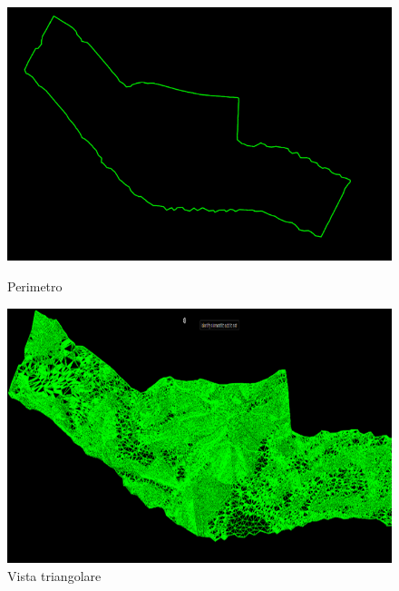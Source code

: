   \begin{figure}[H]
    \centering
    \begin{minipage}[b]{0.45\textwidth}
      \includegraphics[width=\textwidth]{Figures/perimetro.png}
      \caption{Perimetro}
      \label{perimetro}
    \end{minipage}
    \hfill
    \begin{minipage}[b]{0.45\textwidth}
      \includegraphics[width=\textwidth]{Figures/vista triangolare.png}
      \caption{Vista triangolare}
      \label{vista triangolare}
    \end{minipage}
  \end{figure}